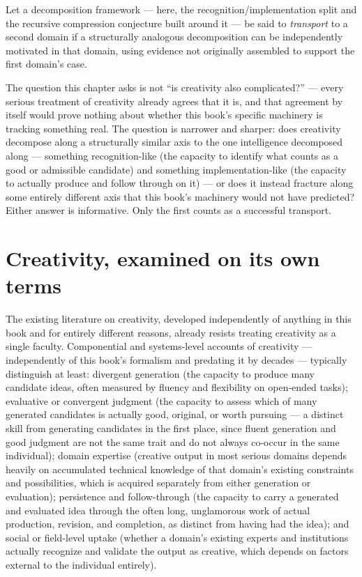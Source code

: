 \begin{definition}
Let a decomposition framework --- here, the recognition/implementation split and the recursive compression conjecture built around it --- be said to \emph{transport} to a second domain if a structurally analogous decomposition can be independently motivated in that domain, using evidence not originally assembled to support the first domain's case.
\end{definition}

The question this chapter asks is not ``is creativity also complicated?'' --- every serious treatment of creativity already agrees that it is, and that agreement by itself would prove nothing about whether this book's specific machinery is tracking something real. The question is narrower and sharper: does creativity decompose along a structurally similar axis to the one intelligence decomposed along --- something recognition-like (the capacity to identify what counts as a good or admissible candidate) and something implementation-like (the capacity to actually produce and follow through on it) --- or does it instead fracture along some entirely different axis that this book's machinery would not have predicted? Either answer is informative. Only the first counts as a successful transport.

\section{Creativity, examined on its own terms}

The existing literature on creativity, developed independently of anything in this book and for entirely different reasons, already resists treating creativity as a single faculty. Componential and systems-level accounts of creativity --- independently of this book's formalism and predating it by decades --- typically distinguish at least: divergent generation (the capacity to produce many candidate ideas, often measured by fluency and flexibility on open-ended tasks); evaluative or convergent judgment (the capacity to assess which of many generated candidates is actually good, original, or worth pursuing --- a distinct skill from generating candidates in the first place, since fluent generation and good judgment are not the same trait and do not always co-occur in the same individual); domain expertise (creative output in most serious domains depends heavily on accumulated technical knowledge of that domain's existing constraints and possibilities, which is acquired separately from either generation or evaluation); persistence and follow-through (the capacity to carry a generated and evaluated idea through the often long, unglamorous work of actual production, revision, and completion, as distinct from having had the idea); and social or field-level uptake (whether a domain's existing experts and institutions actually recognize and validate the output as creative, which depends on factors external to the individual entirely).

